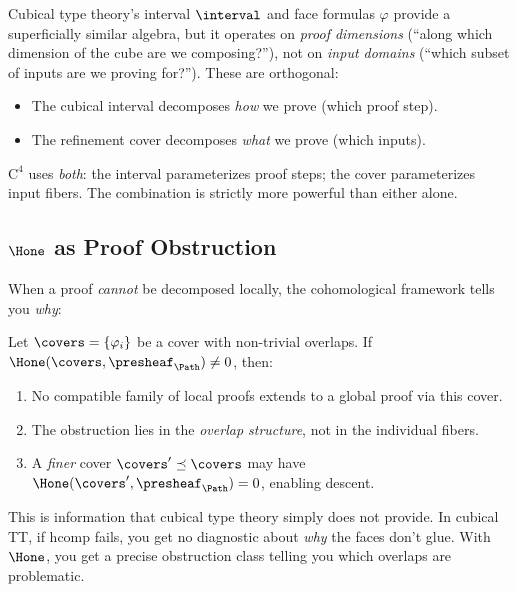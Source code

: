 \begin{remark}
Cubical type theory's interval $\interval$ and face formulas
$\varphi$ provide a superficially similar algebra, but it operates
on \emph{proof dimensions} (``along which dimension of the cube
are we composing?''), not on \emph{input domains} (``which subset
of inputs are we proving for?'').  These are orthogonal:
\begin{itemize}
\item The cubical interval decomposes \emph{how} we prove
  (which proof step).
\item The refinement cover decomposes \emph{what} we prove
  (which inputs).
\end{itemize}
$\mathrm{C}^4$ uses \emph{both}: the interval parameterizes proof
steps; the cover parameterizes input fibers.  The combination is
strictly more powerful than either alone.
\end{remark}


\subsection{$\Hone$ as Proof Obstruction}
\label{sec:h1-obstruction}

When a proof \emph{cannot} be decomposed locally, the cohomological
framework tells you \emph{why}:

\begin{theorem}
\label{thm:h1-obstruction}
Let $\covers = \{\varphi_i\}$ be a cover with non-trivial overlaps.
If $\Hone(\covers, \presheaf_\Path) \neq 0$, then:
\begin{enumerate}
\item No compatible family of local proofs extends to a global proof
  via this cover.
\item The obstruction lies in the \emph{overlap structure}, not in
  the individual fibers.
\item A \emph{finer} cover $\covers' \preceq \covers$ may have
  $\Hone(\covers', \presheaf_\Path) = 0$, enabling descent.
\end{enumerate}
\end{theorem}

This is information that cubical type theory simply does not
provide.  In cubical TT, if \textsf{hcomp} fails, you get no
diagnostic about \emph{why} the faces don't glue.  With
$\Hone$, you get a precise obstruction class telling you
which overlaps are problematic.


